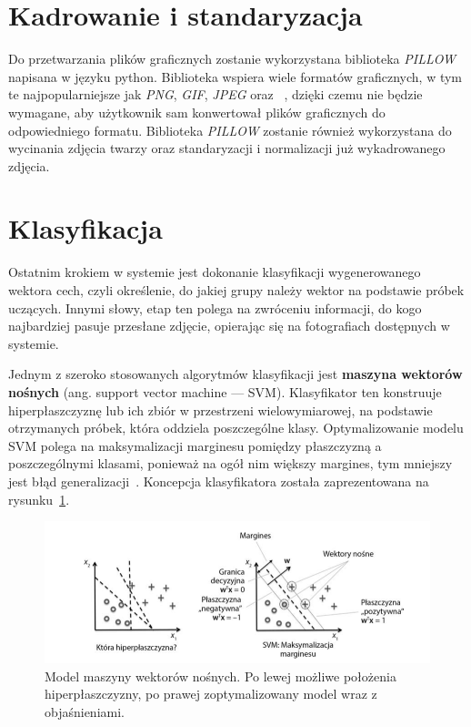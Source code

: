 \section{Kadrowanie i standaryzacja}

Do przetwarzania plików graficznych zostanie wykorzystana biblioteka \textit{PILLOW} napisana w języku python.
Biblioteka wspiera wiele formatów graficznych,
w tym te najpopularniejsze jak \textit{PNG}, \textit{GIF}, \textit{JPEG} oraz ~\cite{pillow_doc},
dzięki czemu nie będzie wymagane, aby użytkownik sam konwertował plików graficznych do odpowiedniego formatu.
Biblioteka \textit{PILLOW} zostanie również wykorzystana do wycinania zdjęcia twarzy oraz standaryzacji
i normalizacji już wykadrowanego zdjęcia.


\section{Klasyfikacja}

Ostatnim krokiem w systemie jest dokonanie klasyfikacji wygenerowanego wektora cech,
czyli określenie, do jakiej grupy należy wektor na podstawie próbek uczących.
Innymi słowy, etap ten polega na zwróceniu informacji, do kogo najbardziej pasuje przesłane zdjęcie,
opierając się na fotografiach dostępnych w systemie.

Jednym z szeroko stosowanych algorytmów klasyfikacji jest
\textbf{maszyna wektorów nośnych} (ang. support vector machine — SVM).
Klasyfikator ten konstruuje hiperpłaszczyznę lub ich zbiór w przestrzeni wielowymiarowej,
na podstawie otrzymanych próbek, która oddziela poszczególne klasy.
Optymalizowanie modelu SVM polega na maksymalizacji marginesu pomiędzy płaszczyzną a poszczególnymi klasami,
ponieważ na ogół nim większy margines, tym mniejszy jest błąd generalizacji~\cite{hastie2009elements}.
Koncepcja klasyfikatora została zaprezentowana na rysunku~\ref{fig:svm}.


\begin{figure}[]
    \centering
    \includegraphics[width=1\textwidth]{images/smv}
    \caption{
        Model maszyny wektorów nośnych.
        Po lewej możliwe położenia hiperpłaszczyzny, po prawej zoptymalizowany model wraz z objaśnieniami.
    }
    \label{fig:svm}
\end{figure}

